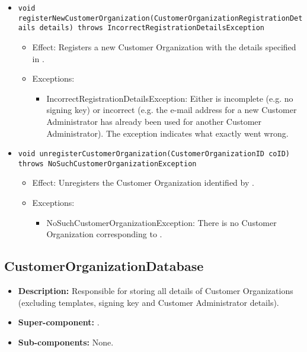 \begin{itemize}
\begin{itemize}
		\item \texttt{void registerNewCustomerOrganization(CustomerOrganizationRegistrationDetails details) throws IncorrectRegistrationDetailsException}
		    \begin{itemize}
                \item Effect: Registers a new Customer Organization with the details specified in .
                \item Exceptions:
				\begin{itemize}
					\item IncorrectRegistrationDetailsException: Either  is incomplete (e.g. no signing key) or incorrect (e.g. the e-mail address for a new Customer Administrator has already been used for another Customer Administrator). The exception indicates what exactly went wrong.
				\end{itemize}
            \end{itemize}

		\item \texttt{void unregisterCustomerOrganization(CustomerOrganizationID coID) throws NoSuchCustomerOrganizationException}
		    \begin{itemize}
                \item Effect: Unregisters the Customer Organization identified by .
                \item Exceptions:
				\begin{itemize}
					\item NoSuchCustomerOrganizationException: There is no Customer Organization corresponding to .
				\end{itemize}
            \end{itemize}
    \end{itemize}
\end{itemize}

\subsection{CustomerOrganizationDatabase}
\begin{itemize}
    \item \textbf{Description:} Responsible for storing all details of Customer Organizations (excluding templates, signing key and Customer Administrator details).
    \item \textbf{Super-component:} .
    \item \textbf{Sub-components:} None.
\end{itemize}

